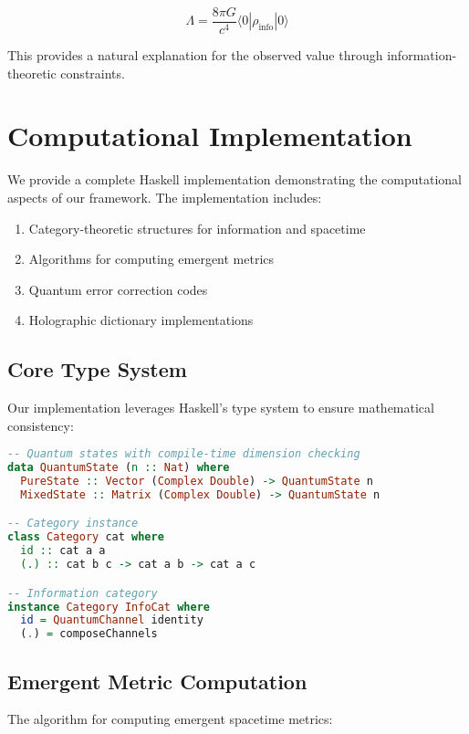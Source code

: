 \documentclass[12pt]{article}
\begin{document}
\begin{equation}
\Lambda = \frac{8\pi G}{c^4} \langle 0|\rho_{\text{info}}|0\rangle
\end{equation}

This provides a natural explanation for the observed value through information-theoretic constraints.

\section{Computational Implementation}

We provide a complete Haskell implementation demonstrating the computational aspects of our framework. The implementation includes:

\begin{enumerate}
\item Category-theoretic structures for information and spacetime
\item Algorithms for computing emergent metrics
\item Quantum error correction codes
\item Holographic dictionary implementations
\end{enumerate}

\subsection{Core Type System}

Our implementation leverages Haskell's type system to ensure mathematical consistency:

\begin{lstlisting}[language=Haskell]
-- Quantum states with compile-time dimension checking
data QuantumState (n :: Nat) where
  PureState :: Vector (Complex Double) -> QuantumState n
  MixedState :: Matrix (Complex Double) -> QuantumState n

-- Category instance
class Category cat where
  id :: cat a a
  (.) :: cat b c -> cat a b -> cat a c

-- Information category
instance Category InfoCat where
  id = QuantumChannel identity
  (.) = composeChannels
\end{lstlisting}

\subsection{Emergent Metric Computation}

The algorithm for computing emergent spacetime metrics:
\end{document}
